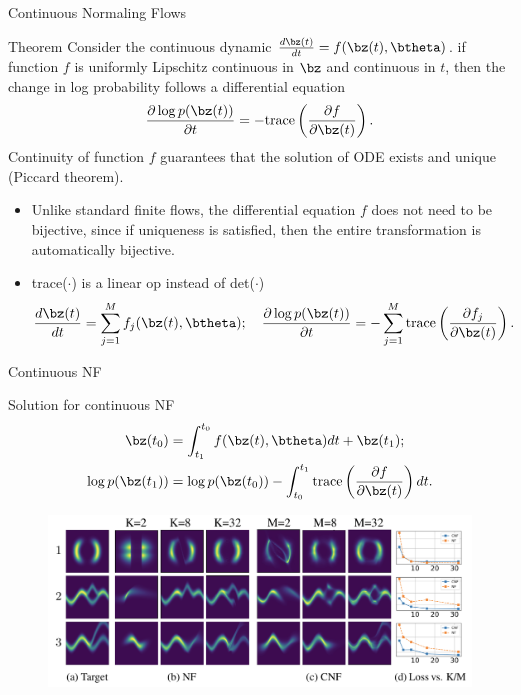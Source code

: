 \begin{frame}{Continuous Normaling Flows}
	\begin{block}{Theorem}
		Consider the continuous dynamic $\frac{d\bz(t)}{dt} = f(\bz(t), \btheta)$. if function $f$ is uniformly Lipschitz continuous in $\bz$ and continuous in $t$, then the change in log probability follows a differential equation
		\[
		\frac{\partial \log p(\bz(t))}{\partial t} = - \text{trace} \left( \frac{\partial f}{\partial \bz(t)} \right).
		\]
		\vspace{-0.1cm}
		Continuity of function $f$ guarantees that the solution of ODE exists and unique (Piccard theorem).
	\end{block}
	\begin{itemize}
		\item Unlike standard finite flows, the differential equation $f$ does not need to be bijective, since if
		uniqueness is satisfied, then the entire transformation is automatically bijective.
		\item trace($\cdot$) is a linear op instead of det($\cdot$)
		\vspace{-0.1cm}
		\[
		\frac{d\bz(t)}{dt} = \sum_{j=1}^M f_j(\bz(t), \btheta); \quad \frac{\partial \log p(\bz(t))}{\partial t} = - \sum_{j=1}^M\text{trace} \left( \frac{\partial f_j}{\partial \bz(t)} \right).
		\]
	\end{itemize}

\end{frame}
\begin{frame}{Continuous NF}
	\begin{block}{Solution for continuous NF}
		\vspace{-0.3cm}
	\begin{align*}
		\bz(t_0) &= \int_{t_1}^{t_0} f(\bz(t), \btheta) dt + \bz(t_1); \\
	    \log p(\bz(t_1)) &= \log p(\bz(t_0)) - \int_{t_0}^{t_1} \text{trace} \left( \frac{\partial f}{\partial \bz(t)} \right) dt.
	\end{align*}
	\end{block}
	\vspace{-0.3cm}
	\begin{figure}
	    \centering
	    \includegraphics[width=1\linewidth]{figs/cnf}
	\end{figure}

\end{frame}
